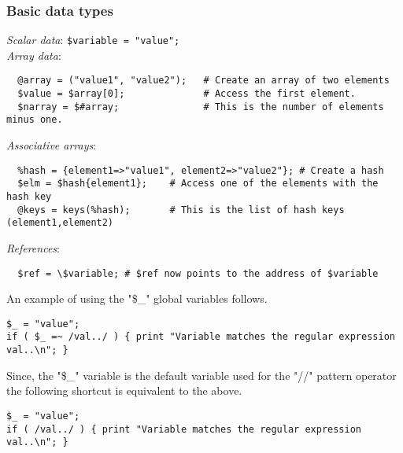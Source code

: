 \documentclass[]{article}
\begin{document}
\subsubsection{Basic data types}
       {\em Scalar data}: \texttt{\$variable = "value";} \\
       {\em Array data}:
\begin{ttfamily}
\begin{verbatim}
  @array = ("value1", "value2");   # Create an array of two elements
  $value = $array[0];              # Access the first element.
  $narray = $#array;               # This is the number of elements minus one.

\end{verbatim}
\end{ttfamily}
       {\em Associative arrays}:  
\begin{ttfamily}
\begin{verbatim}
  %hash = {element1=>"value1", element2=>"value2"}; # Create a hash
  $elm = $hash{element1};    # Access one of the elements with the hash key
  @keys = keys(%hash);       # This is the list of hash keys (element1,element2)

\end{verbatim}
\end{ttfamily}
       {\em References}:
\begin{ttfamily}
\begin{verbatim}
  $ref = \$variable; # $ref now points to the address of $variable

\end{verbatim}
\end{ttfamily}

An example of using the "\$\_" global variables follows.

\begin{ttfamily}
\begin{verbatim}
$_ = "value";
if ( $_ =~ /val../ ) { print "Variable matches the regular expression val..\n"; }
\end{verbatim}
\end{ttfamily}
Since, the "\$\_" variable is the default variable used for the "//" pattern operator
the following shortcut is equivalent to the above.
\begin{ttfamily}
\begin{verbatim}
$_ = "value";
if ( /val../ ) { print "Variable matches the regular expression val..\n"; }
\end{verbatim}
\end{ttfamily}
  
\end{document}
